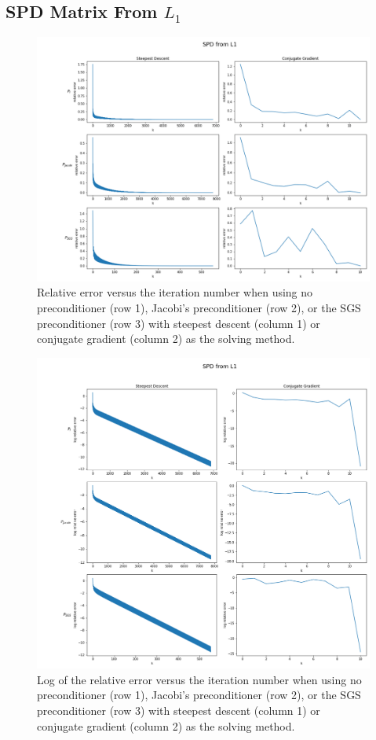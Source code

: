 \documentclass[11pt]{article}
\begin{document}
\subsection{SPD Matrix From $L_1$}
\begin{figure}[h!]
	\hspace*{-2cm}
	\centering
	\includegraphics[width=1.2\linewidth]{../figures/SPD L1 Errors}
	\caption{Relative error versus the iteration number when using no preconditioner (row 1), Jacobi's preconditioner (row 2), or the SGS preconditioner (row 3) with steepest descent (column 1) or conjugate gradient (column 2) as the solving method.}
	\label{fig:SPD}
\end{figure}

\begin{figure}[h!]
	\hspace*{-3cm}
	\centering
	\includegraphics[width=1.3\linewidth]{../figures/Log SPD L1 Errors}
	\caption{Log of the relative error versus the iteration number when using no preconditioner (row 1), Jacobi's preconditioner (row 2), or the SGS preconditioner (row 3) with steepest descent (column 1) or conjugate gradient (column 2) as the solving method.}
	\label{fig:LogSPD}
\end{figure}
\end{document}
